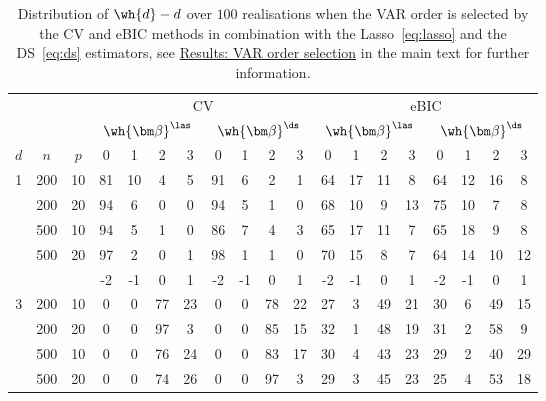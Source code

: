 \begin{table}[htb!]
\caption{Distribution of $\wh{d} - d$ over $100$ realisations when the VAR order is selected by the CV and eBIC methods in combination with the Lasso~\eqref{eq:lasso} and the DS~\eqref{eq:ds} estimators, see \hyperref[sec:sim:order]{Results: VAR order selection} in the main text for further information.}
\label{table:order}
\centering
\resizebox{\columnwidth}{!}
{\scriptsize 
\begin{tabular}{ccc cccc cccc cccc cccc}
\toprule
&	&	&	\multicolumn{8}{c}{CV} &						\multicolumn{8}{c}{eBIC} 						\\	\cmidrule(lr){4-11} \cmidrule(lr){12-19}
&	&	& \multicolumn{4}{c}{$\wh{\bm\beta}^{\las}$} &		\multicolumn{4}{c}{$\wh{\bm\beta}^{\ds}$}
& \multicolumn{4}{c}{$\wh{\bm\beta}^{\las}$} &		\multicolumn{4}{c}{$\wh{\bm\beta}^{\ds}$}\\ \cmidrule(lr){4-7}\cmidrule(lr){8-11} \cmidrule(lr){12-15} \cmidrule(lr){16-19}
$d$ &	$n$ &	$p$ &	0 &	1 &	2 &	3 &	0 &	1 &	2 &	3  &	0 &	1 &	2 &	3 &	0 &	1 &	2 &	3   \\	\cmidrule(lr){1-3} \cmidrule(lr){4-7}\cmidrule(lr){8-11} \cmidrule(lr){12-15} \cmidrule(lr){16-19}
1 & 200 & 10 &  81  & 10   & 4   & 5  & 91  &  6  &  2 &   1 &  64  &  17   & 11    & 8  &  64   & 12    &16   &  8\\
 & 200 & 20 &  94  &  6  &  0 &   0  & 94  &  5 &   1  &  0 &68  &  10  &   9  &  13 &   75  &  10  &   7   &  8\\
 & 500 & 10 & 94  &  5 &   1&    0 &  86   & 7   & 4  &  3 &65 &   17  &  11  &   7   & 65  &  18 &    9 &    8\\ 
 & 500 & 20 &  97  &  2 &   0   & 1 &  98  &  1 &   1   & 0 &70 &   15  &   8   &  7  &  64  &  14  &  10  &  12\\
 \cmidrule(lr){1-19}
 &  &  & -2 & -1 & 0 & 1 & -2 & -1 & 0 & 1 & -2 & -1 & 0 & 1 & -2 & -1 & 0 & 1  \\   \cmidrule(lr){4-7}\cmidrule(lr){8-11} \cmidrule(lr){12-15} \cmidrule(lr){16-19}
3 & 200 & 10 &   0 &   0  & 77 &  23   & 0  &  0  & 78  & 22 & 27 &    3 &   49  &  21  &  30  &   6   & 49   & 15\\
 & 200 & 20 &  0  &  0  & 97 &   3  &  0  &  0  & 85  & 15 & 32   &  1  &  48  &  19  &  31 &    2 &   58   &  9\\
 & 500 & 10 & 0  &  0  & 76  & 24  &  0  &  0  & 83  & 17 &30  &   4  &  43   & 23   & 29 &    2  &  40  &  29\\ 
 & 500 & 20 &  0  &  0 &  74  & 26 &   0  &  0  & 97  &  3 &29  &   3   & 45   & 23  &  25  &   4 &   53  &  18\\
  \bottomrule
\end{tabular}}
\end{table}

